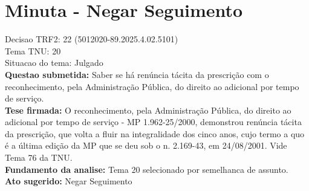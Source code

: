 \documentclass{article}
\begin{document}
\section*{Minuta - Negar Seguimento}
Decisao TRF2: 22 (5012020-89.2025.4.02.5101)\\
Tema TNU: 20\\
Situacao do tema: Julgado\\
\textbf{Questao submetida:} Saber se há renúncia tácita da prescrição com o reconhecimento, pela Administração Pública, do direito ao adicional por tempo de serviço.\\
\textbf{Tese firmada:} O reconhecimento, pela Administração Pública, do direito ao adicional por tempo de serviço - MP 1.962-25/2000, demonstrou renúncia tácita da prescrição, que volta a fluir na integralidade dos cinco anos, cujo termo a quo é a última edição da MP que se deu sob o n. 2.169-43, em 24/08/2001. Vide Tema 76 da TNU.\\
\textbf{Fundamento da analise:} Tema 20 selecionado por semelhanca de assunto.\\
\textbf{Ato sugerido:} Negar Seguimento
\end{document}
